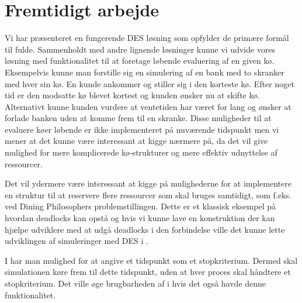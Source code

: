 \section{Fremtidigt arbejde}
Vi har præsenteret en fungerende DES løsning som opfylder de primære formål til fulde. Sammenholdt med andre lignende løsninger kunne vi udvide vores løsning med funktionalitet til at foretage løbende evaluering af en given kø. Eksempelvis kunne man forstille sig en simulering af en bank med to skranker med hver sin kø. En kunde ankommer og stiller sig i den korteste kø. Efter noget tid er den modsatte kø blevet kortest og kunden ønsker nu at skifte kø. Alternativt kunne kunden vurdere at ventetiden har været for lang og ønsker at forlade banken uden at komme frem til en skranke. Disse muligheder til at evaluere køer løbende er ikke implementeret på nuværende tidspunkt men vi mener at det kunne være interessant at kigge nærmere på, da det vil give mulighed for mere komplicerede kø-strukturer og mere effektiv udnyttelse af ressourcer.

Det vil ydermere være interessant at kigge på mulighederne for at implementere en struktur til at reservere flere ressourcer som skal bruges samtidigt, som f.eks. ved Dining Philosophers problemstillingen. Dette er et klassisk eksempel på hvordan deadlocks kan opstå og hvis vi kunne lave en konstruktion der kan hjælpe udviklere med at udgå deadlocks i den forbindelse ville det kunne lette udviklingen af simuleringer med DES i \pycsp. 

I \simpy har man mulighed for at angive et tidspunkt som et stopkriterium. Dermed skal  simulationen køre frem til dette tidspunkt, uden at hver proces skal håndtere et stopkriterium. Det ville øge brugbarheden af \des i \pycsp hvis det også havde denne funktionalitet.
